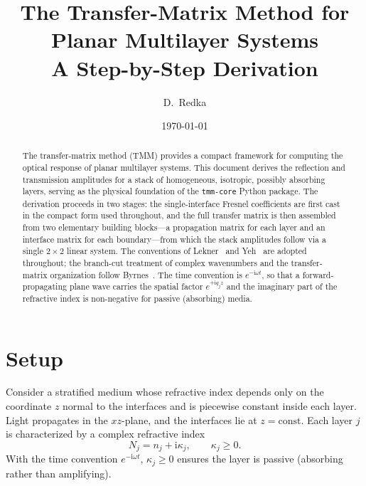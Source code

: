 \documentclass[aps,prb,onecolumn,superscriptaddress,nofootinbib,11pt]{revtex4-2}
\newcommand{\ii}{\mathrm{i}}
\begin{document}
\title{The Transfer-Matrix Method for Planar Multilayer Systems\\[2pt]
\large\normalfont A Step-by-Step Derivation}
\author{D.~Redka}
\date{\today}

\begin{abstract}
The transfer-matrix method (TMM) provides a compact framework for computing the optical response of planar multilayer systems. This document derives the reflection and transmission amplitudes for a stack of homogeneous, isotropic, possibly absorbing layers, serving as the physical foundation of the \texttt{tmm-core} Python package. The derivation proceeds in two stages: the single-interface Fresnel coefficients are first cast in the compact form used throughout, and the full transfer matrix is then assembled from two elementary building blocks---a propagation matrix for each layer and an interface matrix for each boundary---from which the stack amplitudes follow via a single $2\times 2$ linear system. The conventions of Lekner~\cite{Lekner2016} and Yeh~\cite{Yeh2005} are adopted throughout; the branch-cut treatment of complex wavenumbers and the transfer-matrix organization follow Byrnes~\cite{Byrnes2020}. The time convention is $e^{-\ii\omega t}$, so that a forward-propagating plane wave carries the spatial factor $e^{+\ii q_j z}$ and the imaginary part of the refractive index is non-negative for passive (absorbing) media.
\end{abstract}

\maketitle

\tableofcontents

\section{Setup}

Consider a stratified medium whose refractive index depends only on the coordinate $z$ normal to the interfaces and is piecewise constant inside each layer. Light propagates in the $xz$-plane, and the interfaces lie at $z = \text{const.}$ Each layer $j$ is characterized by a complex refractive index
\begin{equation}
  N_j = n_j + \ii \kappa_j, \qquad \kappa_j \ge 0 .
\end{equation}
With the time convention $e^{-\ii\omega t}$, $\kappa_j \ge 0$ ensures the layer is passive (absorbing rather than amplifying).
\end{document}
